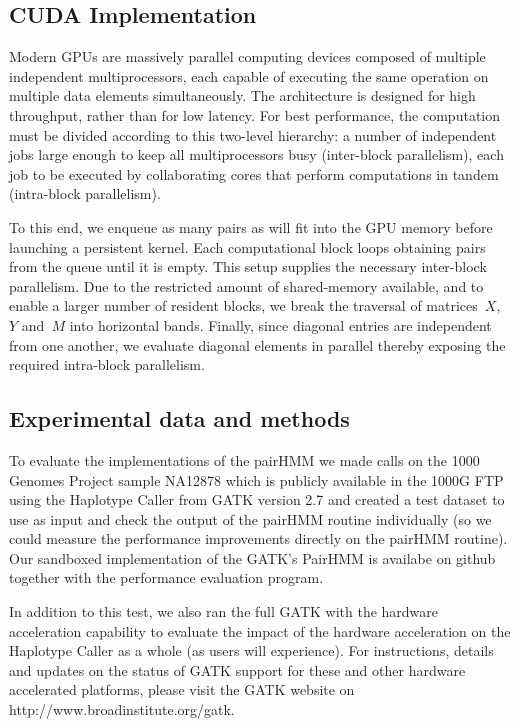 \documentclass[11pt, oneside]{article}
\begin{document}
	
	\subsection{CUDA Implementation} 
	
	Modern GPUs are massively parallel computing devices composed of multiple
	independent multiprocessors, each capable of executing the same operation on
	multiple data elements simultaneously. The architecture is designed for high
	throughput, rather than for low latency.  For best performance, the
	computation must be divided according to this two-level hierarchy: a number
	of independent jobs large enough to keep all multiprocessors busy
	(inter-block parallelism), each job to be executed by collaborating cores
	that perform computations in tandem (intra-block parallelism).

	To this end, we enqueue as many pairs as will fit into the GPU memory before
	launching a persistent kernel.  Each computational block loops obtaining
	pairs from the queue until it is empty. This setup supplies the necessary
	inter-block parallelism.  Due to the restricted amount of shared-memory
	available, and to enable a larger number of resident blocks, we break the
	traversal of matrices~$X$, $Y$ and~$M$ into horizontal bands. Finally, since
	diagonal entries are independent from one another, we evaluate diagonal
	elements in parallel thereby exposing the required intra-block parallelism. 


	\subsection{Experimental data and methods} 
	
    To evaluate the implementations of the pairHMM we made calls on the 1000
    Genomes Project sample NA12878 which is publicly available in the 1000G
    FTP using the Haplotype Caller from GATK version 2.7 and created a test
    dataset to use as input and check the output of the pairHMM routine
    individually (so we could measure the performance improvements directly on
    the pairHMM routine). Our sandboxed implementation of the GATK's PairHMM is
    availabe on github together with the performance evaluation program.
    
    In addition to this test, we also ran the full GATK with the hardware
    acceleration capability to evaluate the impact of the hardware acceleration
    on the Haplotype Caller as a whole (as users will experience). For
    instructions, details and updates on the status of GATK support for these
    and other hardware accelerated platforms, please visit the GATK website on
    http://www.broadinstitute.org/gatk.
	
\end{document}
